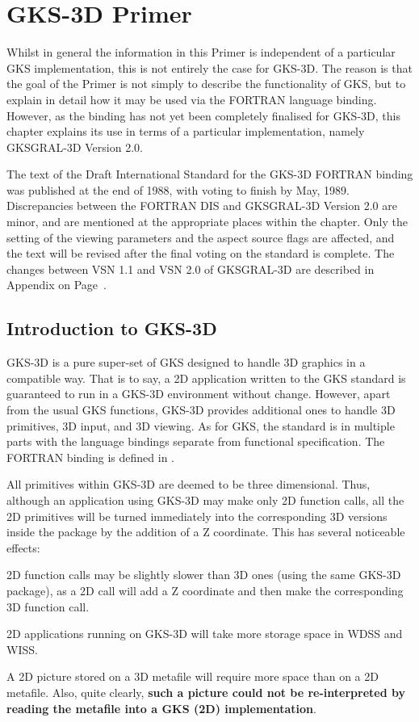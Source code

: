 \chapter{GKS-3D Primer}
\begin{note}
Whilst in general the information in this Primer is independent of
a particular GKS implementation, this is not entirely the case for
GKS-3D. The reason is that the goal of the Primer is not simply
to describe the functionality of GKS, but to explain in detail
how it may be used via the FORTRAN language binding.
However, as the binding has not yet been completely finalised for
GKS-3D, this chapter explains its use in terms of a
particular implementation, namely GKSGRAL-3D Version 2.0.
 
The text of the Draft International Standard for the GKS-3D
FORTRAN binding was published at the end of 1988,
with voting to finish by May, 1989.
Discrepancies between the FORTRAN DIS and GKSGRAL-3D Version 2.0 are minor,
and are mentioned at the appropriate places within the chapter.
Only the setting of the viewing parameters and the aspect source
flags are affected, and the text will be revised after the final
voting on the standard is complete.
The changes between VSN 1.1 and VSN 2.0 of GKSGRAL-3D
are described in Appendix on Page~\pageref{sec:vsn2upd}.
\end{note}
\section{Introduction to GKS-3D}
 
GKS-3D is a pure super-set of GKS designed to handle 3D graphics in
a compatible way. That is to say, a 2D application written to
the GKS standard is guaranteed to run in a GKS-3D environment
without change. However, apart from the usual GKS functions,
GKS-3D provides additional ones to handle 3D primitives,
3D input, and 3D viewing.
As for GKS, the standard is in multiple parts with the language
bindings separate from functional specification.
The FORTRAN binding is defined in \cite{bib-gksftn3}.
 
All primitives within GKS-3D are deemed to be three dimensional.
Thus, although an application using GKS-3D may make only 2D function
calls, all the 2D primitives will be turned immediately into the
corresponding 3D versions inside the package by the addition of
a Z coordinate. This has several noticeable effects:
\begin{UL}
\item 2D function calls may be slightly slower than 3D ones (using the
same GKS-3D package), as a 2D call will add a Z coordinate
and then make the corresponding 3D function call.
\item 2D applications running on GKS-3D will take more storage space
in WDSS and WISS.
\item A 2D picture stored on a 3D metafile will require more space
than on a 2D metafile. Also, quite clearly, {\bf such a picture could
not be re-interpreted by reading the metafile into a GKS (2D)
implementation}.
\end{UL}

